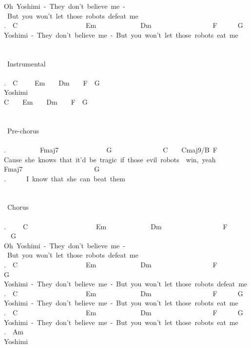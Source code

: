 {Oh\ Yoshimi\ -\ They\ don't\ believe\ me\ -\ But\ you\ won't\ let\ those\ robots\ defeat\ me\\
.\ \ C\ \ \ \ \ \ \ \ \ \ \ \ \ \ \ \ \ \ \ \ Em\ \ \ \ \ \ \ \ \ \ \ \ \ Dm\ \ \ \ \ \ \ \ \ \ \ \ \ \ \ \ \ \ F\ \ \ \ \ \ G\\
Yoshimi\ -\ They\ don't\ believe\ me\ -\ But\ you\ won't\ let\ those\ robots\ eat\ me\\
\\
\\
\lbrack\ Instrumental\rbrack\\
\\
.\ \ C\ \ \ \ \ Em\ \ \ \ Dm\ \ \ \ F\ \ G\\
Yoshimi\\
C\ \ \ \ Em\ \ \ \ Dm\ \ \ \ F\ \ G\\
\\
\\
\lbrack\ Pre-chorus\rbrack\\
\\
.\ \ \ \ \ \ \ \ \ \ Fmaj7\ \ \ \ \ \ \ \ \ \ \ \ \ \ G\ \ \ \ \ \ \ \ \ \ \ \ \ \ \ C\ \ \ \ Cmaj9/B\ F\\
Cause\ she\ knows\ that\ it'd\ be\ tragic\ if\ those\ evil\ robots\ \ win,\ yeah\\
Fmaj7\ \ \ \ \ \ \ \ \ \ \ \ \ \ \ \ \ \ \ \ \ G\\
.\ \ \ \ \ \ I\ know\ that\ she\ can\ beat\ them\\
\\
\\
\lbrack\ Chorus\rbrack\\
\\
.\ \ \ \ \ C\ \ \ \ \ \ \ \ \ \ \ \ \ \ \ \ \ \ \ \ Em\ \ \ \ \ \ \ \ \ \ \ \ \ Dm\ \ \ \ \ \ \ \ \ \ \ \ \ \ \ \ \ \ F\ \ \ \ \ \ \ \ G\\
Oh\ Yoshimi\ -\ They\ don't\ believe\ me\ -\ But\ you\ won't\ let\ those\ robots\ defeat\ me\\
.\ \ C\ \ \ \ \ \ \ \ \ \ \ \ \ \ \ \ \ \ \ \ Em\ \ \ \ \ \ \ \ \ \ \ \ \ Dm\ \ \ \ \ \ \ \ \ \ \ \ \ \ \ \ \ \ F\ \ \ \ \ \ \ \ G\\
Yoshimi\ -\ They\ don't\ believe\ me\ -\ But\ you\ won't\ let\ those\ robots\ defeat\ me\\
.\ \ C\ \ \ \ \ \ \ \ \ \ \ \ \ \ \ \ \ \ \ \ Em\ \ \ \ \ \ \ \ \ \ \ \ \ Dm\ \ \ \ \ \ \ \ \ \ \ \ \ \ \ \ \ \ F\ \ \ \ \ \ G\\
Yoshimi\ -\ They\ don't\ believe\ me\ -\ But\ you\ won't\ let\ those\ robots\ eat\ me\\
.\ \ C\ \ \ \ \ \ \ \ \ \ \ \ \ \ \ \ \ \ \ \ Em\ \ \ \ \ \ \ \ \ \ \ \ \ Dm\ \ \ \ \ \ \ \ \ \ \ \ \ \ \ \ \ \ F\ \ \ \ \ \ G\\
Yoshimi\ -\ They\ don't\ believe\ me\ -\ But\ you\ won't\ let\ those\ robots\ eat\ me\\
.\ \ Am\\
Yoshimi}
